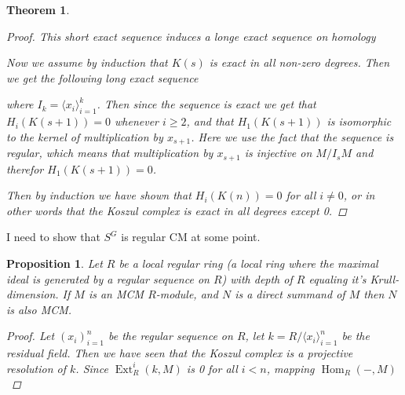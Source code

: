 \documentclass[11pt, a4paper, english]{article}
\newtheorem{prop}{Proposition}
\numberwithin{prop}{section}
\numberwithin{lemma}{section}
\newtheorem{theorem}{Theorem}
\numberwithin{theorem}{section}
\numberwithin{defin}{section}
\numberwithin{example}{section}
\DeclareMathOperator{\Hom}{Hom}
\DeclareMathOperator{\Ext}{Ext}
\begin{document}
\begin{theorem}
\begin{proof}
This short exact sequence induces a longe exact sequence on homology
\begin{center}
\end{center}
Now we assume by induction that $K(s)$ is exact in all non-zero degrees. Then we get the following long exact sequence
\begin{center}
\end{center}
where $I_k = \langle x_i \rangle_{i=1}^k$. Then since the sequence is exact we get that $H_i(K(s+1)) = 0$ whenever $i \geq 2$, and that $H_1(K(s+1))$ is isomorphic to the kernel of multiplication by $x_{s+1}$. Here we use the fact that the sequence is regular, which means that multiplication by $x_{s+1}$ is injective on $M/I_sM$ and therefor $H_1(K(s+1)) = 0$.

Then by induction we have shown that $H_i(K(n)) = 0$ for all $i \neq 0$, or in other words that the Koszul complex is exact in all degrees except 0.
\end{proof}
\end{theorem}

{\color{red} I need to show that $S^G$ is regular CM at some point.}
\begin{prop}
Let $R$ be a local regular ring (a local ring where the maximal ideal is generated by a regular sequence on $R$) with depth of $R$ equaling it's Krull-dimension. If $M$ is an MCM $R$-module, and $N$ is a direct summand of $M$ then $N$ is also MCM.
\begin{proof}
Let $(x_i)_{i=1}^n$ be the regular sequence on $R$, let $k = R/\langle x_i \rangle_{i=1}^n$ be the residual field. Then we have seen that the Koszul complex is a projective resolution of $k$. Since $\Ext_R^i(k, M)$ is 0 for all $i < n$, mapping $\Hom_R(-, M)$
\end{proof}
\end{prop}
\end{document}
